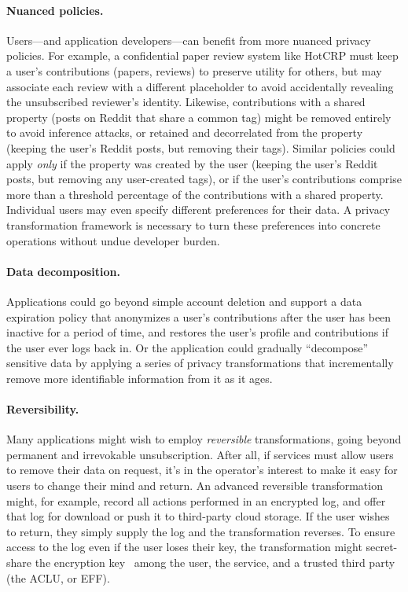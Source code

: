 \paragraph{Nuanced policies.}
%
Users---and application developers---can benefit from more nuanced privacy policies.
%
For example, a confidential paper review system like HotCRP must keep a user's contributions
(papers, reviews) to preserve utility for others, but may associate each review with a different
placeholder to avoid accidentally revealing the unsubscribed reviewer's identity.
%
Likewise, contributions with a shared property (\eg posts on Reddit that share a common tag)
might be removed entirely to avoid inference attacks, or retained and decorrelated from the
property (\eg keeping the user's Reddit posts, but removing their tags).
%
Similar policies could apply \emph{only} if the property was created by the user (\eg keeping
the user's Reddit posts, but removing any user-created tags), or if the user's contributions
comprise more than a threshold percentage of the contributions with a shared property.
%
Individual users may even specify different preferences for their data.
%
A privacy transformation framework is necessary to turn these preferences into concrete
operations without undue developer burden.
%

\paragraph{Data decomposition.}
%
Applications could go beyond simple account deletion and support a data expiration policy that
anonymizes a user's contributions after the user has been inactive for a period of time, and
restores the user's profile and contributions if the user ever logs back in.
%
Or the application could gradually ``decompose'' sensitive data by applying a series of
privacy transformations that incrementally remove more identifiable information from it as it
ages.
%

\paragraph{Reversibility.}
%
Many applications might wish to employ \emph{reversible} transformations, going beyond permanent
and irrevokable unsubscription.
%
After all, if services must allow users to remove their data on request, it's in the operator's
interest to make it easy for users to change their mind and return.
%
An advanced reversible transformation might, for example, record all actions performed in an
encrypted log, and offer that log for download or push it to third-party cloud storage.
%
If the user wishes to return, they simply supply the log and the transformation reverses.
%
To ensure access to the log even if the user loses their key, the transformation might
secret-share the encryption key~\cite{secretsharing} among the user, the service, and a trusted
third party (\eg the ACLU, or EFF).
%




